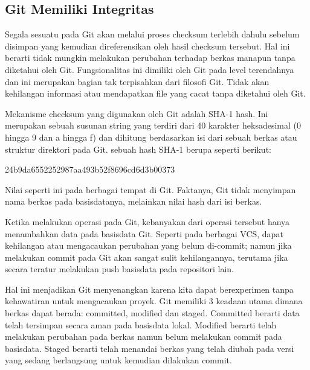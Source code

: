 \subsection{Git Memiliki Integritas }
\par
\hspace*{0.5in} Segala sesuatu pada Git akan melalui proses checksum terlebih dahulu sebelum disimpan yang kemudian direferensikan oleh hasil checksum tersebut. Hal ini berarti tidak mungkin melakukan perubahan terhadap berkas manapun tanpa diketahui oleh Git. Fungsionalitas ini dimiliki oleh Git pada level terendahnya dan ini merupakan bagian tak terpisahkan dari filosofi Git. Tidak akan kehilangan informasi atau mendapatkan file yang cacat tanpa diketahui oleh Git. \par
\hspace*{0.5in} Mekanisme checksum yang digunakan oleh Git adalah SHA-1 hash. Ini merupakan sebuah susunan string yang terdiri dari 40 karakter heksadesimal (0 hingga 9 dan a hingga f) dan dihitung berdasarkan isi dari sebuah berkas atau struktur direktori pada Git. sebuah hash SHA-1 berupa seperti berikut: \par
\noindent 
24b9da6552252987aa493b52f8696cd6d3b00373 \par
\vspace{12pt}
\hspace*{0.5in}Nilai seperti ini pada berbagai tempat di Git. Faktanya, Git tidak menyimpan nama berkas pada basisdatanya, melainkan nilai hash dari isi berkas. \par
\hspace*{0.5in} Ketika melakukan operasi pada Git, kebanyakan dari operasi tersebut hanya menambahkan data pada basisdata Git. Seperti pada berbagai VCS, dapat kehilangan atau mengacaukan perubahan yang belum di-commit; namun jika melakukan commit pada Git akan sangat sulit kehilangannya, terutama jika  secara teratur melakukan push basisdata pada repositori lain. \par
\hspace*{0.5in} Hal ini menjadikan Git menyenangkan karena kita dapat berexperimen tanpa kehawatiran untuk mengacaukan proyek. Git memiliki 3 keadaan utama dimana berkas dapat berada: committed, modified dan staged. Committed berarti data telah tersimpan secara aman pada basisdata lokal. Modified berarti telah melakukan perubahan pada berkas namun belum melakukan commit pada basisdata. Staged berarti telah menandai berkas yang telah diubah pada versi yang sedang berlangsung untuk kemudian dilakukan commit. \par
